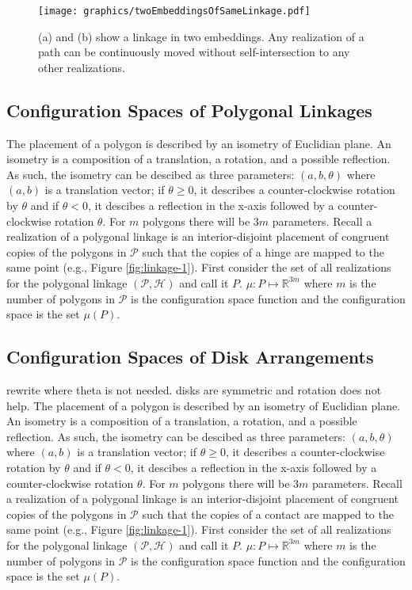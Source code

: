 \documentclass[10pt]{CSUNthesis}
\theoremstyle{plain}%
\theoremstyle{definition}
\theoremstyle{remark}
\newcommand{\HH}{{\mathcal{H}}} %
\renewcommand{\PP}{{\mathcal{P}}} %
\newcommand{\bbR}{{\mathbb{R}}}
\newcommand{\lr}[1]{\left( #1 \right)}
\begin{document}

\begin{figure}[!htbp]%
\begin{center}
\texttt{[image: graphics/twoEmbeddingsOfSameLinkage.pdf]}
\end{center} 
\caption{(a) and (b) show a linkage in two embeddings.  Any realization of a path can be continuously moved without self-intersection to any other realizations.}
\label{fig:twoEmbeddingsOfSameLinkage.pdf}
\end{figure}

\subsection{Configuration Spaces of Polygonal Linkages}
The placement of a polygon is described by an isometry of Euclidian plane.
An isometry is a composition of a translation, a rotation, and a possible reflection.
As such, the isometry can be descibed as three parameters: $\lr{a,b,\theta}$ where $(a,b)$ is a translation vector; if $\theta \geq 0$, it describes a counter-clockwise rotation by $\theta$ and if $\theta < 0$, it descibes a reflection in the x-axis followed by a counter-clockwise rotation $\theta$.
For $m$ polygons there will be $3 m$ parameters.
Recall a realization of a polygonal linkage is an interior-disjoint placement of congruent copies of the polygons in $\PP$ such that the copies of a hinge are mapped to the same point (e.g., Figure \ref{fig:linkage-1}).
First consider the set of all realizations for the polygonal linkage $\left(\PP,\HH\right)$ and call it $P$.  
$\mu:P \mapsto \bbR^{3m}$ where $m$ is the number of polygons in $\PP$ is the configuration space function and the configuration space is the set $\mu(P)$. 

 \subsection{Configuration Spaces of Disk Arrangements}
rewrite where theta is not needed.  disks are symmetric and rotation does not help.
The placement of a polygon is described by an isometry of Euclidian plane.
An isometry is a composition of a translation, a rotation, and a possible reflection.
As such, the isometry can be descibed as three parameters: $\lr{a,b,\theta}$ where $(a,b)$ is a translation vector; if $\theta \geq 0$, it describes a counter-clockwise rotation by $\theta$ and if $\theta < 0$, it descibes a reflection in the x-axis followed by a counter-clockwise rotation $\theta$.
For $m$ polygons there will be $3 m$ parameters.
Recall a realization of a polygonal linkage is an interior-disjoint placement of congruent copies of the polygons in $\PP$ such that the copies of a contact are mapped to the same point (e.g., Figure \ref{fig:linkage-1}).
First consider the set of all realizations for the polygonal linkage $\left(\PP,\HH\right)$ and call it $P$.  
$\mu:P \mapsto \bbR^{3m}$ where $m$ is the number of polygons in $\PP$ is the configuration space function and the configuration space is the set $\mu(P)$. 
\end{document}
